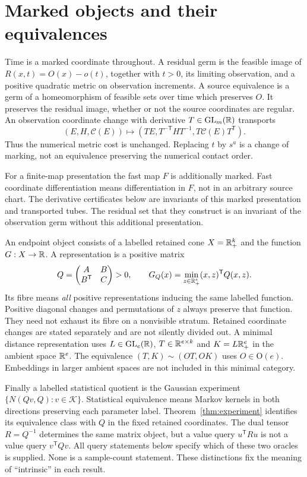 \section{Marked objects and their equivalences}\label{sec:categories}
Time is a marked coordinate throughout. A residual germ is the feasible image of
$R(x,t)=O(x)-o(t)$, together with $t>0$, its limiting observation, and a positive
quadratic metric on observation increments. A source equivalence is a germ of a
homeomorphism of feasible sets over time which preserves $O$. It preserves the
residual image, whether or not the source coordinates are regular. An observation
coordinate change with derivative $T\in\mathrm{GL}_m(\mathbb R)$ transports
\[
 (E,H,\mathcal C(E))\longmapsto
 (TE,T^{-\mathsf T}HT^{-1},T\mathcal C(E)T^{\mathsf T}).
\]
Thus the numerical metric cost is unchanged. Replacing $t$ by $s^a$ is a change
of marking, not an equivalence preserving the numerical contact order.

For a finite-map presentation the fast map $F$ is additionally marked. Fast
coordinate differentiation means differentiation in $F$, not in an arbitrary
source chart. The derivative certificates below are invariants of this marked
presentation and transported tubes. The residual set that they construct is an
invariant of the observation germ without this additional presentation.

An endpoint object consists of a labelled retained cone $X=\mathbb R_+^k$ and the
function $G:X\to\mathbb R$. A representation is a positive matrix
\begin{equation}\label{eq:intro-profile}
 Q=\begin{pmatrix}A&B\\B^{\mathsf T}&C\end{pmatrix}>0,
 \qquad G_Q(x)=\min_{z\in\mathbb R_+^e}(x,z)^{\mathsf T}Q(x,z).
\end{equation}
Its fibre means \emph{all} positive representations inducing the same labelled
function. Positive diagonal changes and permutations of $z$ always preserve
that function. They need not exhaust its fibre on a nonvisible stratum. Retained
coordinate changes are stated separately and are not silently divided out.
A minimal distance representation uses $L\in\mathrm{GL}_e(\mathbb R)$,
$T\in\mathbb R^{e\times k}$ and $K=L\mathbb R_+^e$ in the ambient space $\mathbb R^e$.
The equivalence $(T,K)\sim(OT,OK)$ uses $O\in\mathrm O(e)$.
Embeddings in larger ambient spaces are not included in this minimal category.

Finally a labelled statistical quotient is the Gaussian experiment
$\{N(Qv,Q):v\in\mathcal K\}$. Statistical equivalence means Markov kernels in
both directions preserving each parameter label. Theorem~\ref{thm:experiment}
identifies its equivalence class with $Q$ in the fixed retained coordinates.
The dual tensor $R=Q^{-1}$ determines the same matrix object, but a value query
$u^{\mathsf T}Ru$ is not a value query $v^{\mathsf T}Qv$. All query statements
below specify which of these two oracles is supplied. None is a sample-count
statement. These distinctions fix the meaning of ``intrinsic'' in each result.
